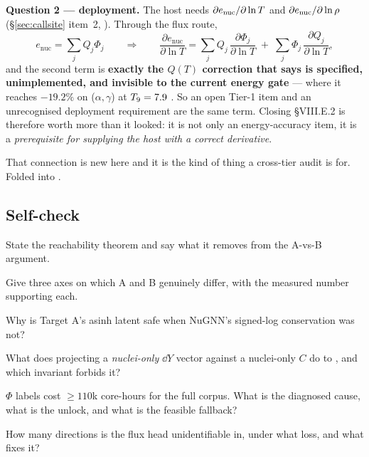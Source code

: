 \textbf{Question 2 --- deployment.} The host needs $\partial e_{\mathrm{nuc}}/\partial\ln T$
and $\partial e_{\mathrm{nuc}}/\partial\ln\rho$ (\S\ref{sec:callsite} item~2, ).
Through the flux route,
%
\begin{equation}
\label{eq:denucdlnT}
e_{\mathrm{nuc}} = \sum_j Q_j \Phi_j
\qquad\Longrightarrow\qquad
\frac{\partial e_{\mathrm{nuc}}}{\partial \ln T}
= \sum_j Q_j\,\frac{\partial \Phi_j}{\partial \ln T}
\;+\;\sum_j \Phi_j\,\frac{\partial Q_j}{\partial \ln T},
\end{equation}
%
and the second term is \textbf{exactly the $Q(T)$ correction that
 says is specified, unimplemented, and invisible to the
current energy gate} --- where it reaches $-19.2\%$ on
($\alpha,\gamma$) at $T_{9} = 7.9$
. So an open Tier-1 item and an
unrecognised deployment requirement are the same term. Closing \S VIII.E.2 is
therefore worth more than it looked: it is not only an energy-accuracy item, it
is a \emph{prerequisite for supplying the host with a correct derivative}.

That connection is new here and it is the kind of thing a cross-tier audit is
for. Folded into .

\subsection{Self-check}
\label{sec:selfcheck-target}

\begin{selfcheck}
\item %
  State the reachability theorem and say what it removes from the A-vs-B
  argument.
\item %
  Give three axes on which A and B genuinely differ, with the measured number
  supporting each.
\item %
  Why is Target A's asinh latent safe when NuGNN's signed-log conservation was
  not?
\item %
  What does projecting a \emph{nuclei-only} $\dd Y$ vector against a
  nuclei-only $C$ do to \Ye, and which invariant forbids it?
\item %
  $\Phi$ labels cost $\ge 110$k core-hours for the full corpus. What is the
  diagnosed cause, what is the unlock, and what is the feasible fallback?
\item %
  How many directions is the flux head unidentifiable in, under what loss, and
  what fixes it?
\end{selfcheck}
